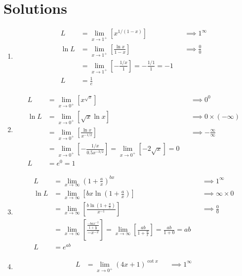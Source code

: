 \documentclass[12pt, A4]{report}
\begin{document}
		\section*{Solutions}
			\begin{enumerate}
				\item
					\begin{align*}
						L &= \lim_{x\to 1^+}\left[x^{1/(1-x)}\right]
								&&\implies 1^{\infty} \\
						\ln L &= \lim_{x\to 1^+}\left[\frac{\ln x}{1 - x}\right]
								&&\implies \frac{0}{0} \\
							&= \lim_{x\to 1^+}\left[-\frac{1/x}{1}\right] 
								= -\frac{1/1}{1} = -1 \\
						L &= \frac{1}{e}
					\end{align*}
				\item
					\begin{align*}
						L &= \lim_{x\to 0^+}\left[x^{\sqrt{x}}\right] 
							&&\implies 0^0 \\
						\ln L &= \lim_{x\to 0^+}\left[\sqrt{x}\ln x\right] 
							&&\implies 0 \times (-\infty) \\
						&= \lim_{x\to 0^+}\left[\frac{\ln x}{x^{-1/2}}\right] 
							&&\implies -\frac{\infty}{\infty} \\
						&= \lim_{x\to 0^+}\left[-\frac{1/x}{0.5x^{-3/2}}\right] 
							= \lim_{x\to 0^+}\left[-2\sqrt{x}\right] = 0 \\
						L &= e^0 = 1
					\end{align*}
				\item
					\begin{align*}
						L &= \lim_{x\to\infty}\left(1 + \frac{a}{x}\right)^{bx}
								&&\implies 1^{\infty} \\
						\ln L &= \lim_{x\to\infty}\left[bx\ln\left(1 + \frac{a}{x}\right)\right]
								&&\implies \infty \times 0 \\
							&= \lim_{x\to\infty}\left[\frac{b\ln\left(1 + \frac{a}{x}\right)}{x^{-1}}\right]
								&&\implies \frac{0}{0} \\
							&= \lim_{x\to\infty}\left[\frac{\frac{-bax^{-2}}{1 + \frac{a}{x}}}{-x^{-2}}\right] 
								= \lim_{x\to\infty}\left[\frac{ab}{1 + \frac{a}{x}}\right] 
								= \frac{ab}{1 + 0} = ab \\
						L &= e^{ab}
					\end{align*}
				\item
					\begin{align*}
						L &= \lim_{x\to 0^+}(4x + 1)^{\cot x}
								&&\implies 1^{\infty} \\

\end{align*}
\end{enumerate}
\end{document}
